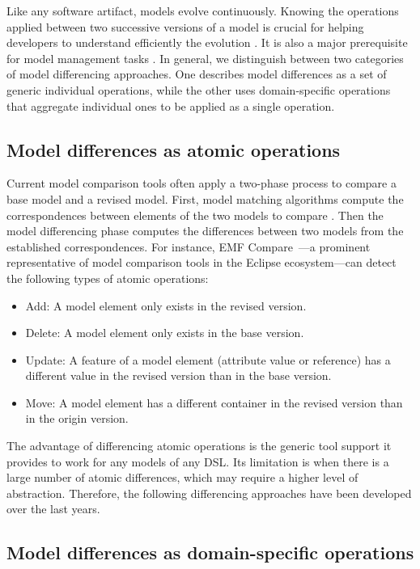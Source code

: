 Like any software artifact, models evolve continuously.
Knowing the operations applied between two successive versions of a model is crucial for helping developers to understand efficiently the evolution .
It is also a major prerequisite for model management tasks .
In general, we distinguish between two categories of model differencing approaches.
One describes model differences as a set of generic individual operations, while the other uses domain-specific operations that aggregate individual ones to be applied as a single operation.

\subsection{Model differences as atomic operations}

Current model comparison tools often apply a two-phase process to compare a base model and a revised model.
First, model matching algorithms compute the correspondences between elements of the two models to compare .
Then the model differencing phase computes the differences between two models from the established correspondences.
For instance, EMF Compare~\cite{Brun2008}---a prominent representative of model comparison tools in the Eclipse ecosystem---can detect the following types of atomic operations:
%
\begin{itemize}%
  \item Add: A model element only exists in the revised version.
  \item Delete: A model element only exists in the base version.
  \item Update: A feature of a model element (attribute value or reference) has a different value in the revised version than in the base version.
  \item Move: A model element has a different container in the revised version than in the origin version.
\end{itemize}

The advantage of differencing atomic operations is the generic tool support it provides to work for any models of any DSL.
Its limitation is when there is a large number of atomic differences, which may require a higher level of abstraction.
Therefore, the following differencing approaches have been developed over the last years.


\subsection{Model differences as domain-specific operations}


